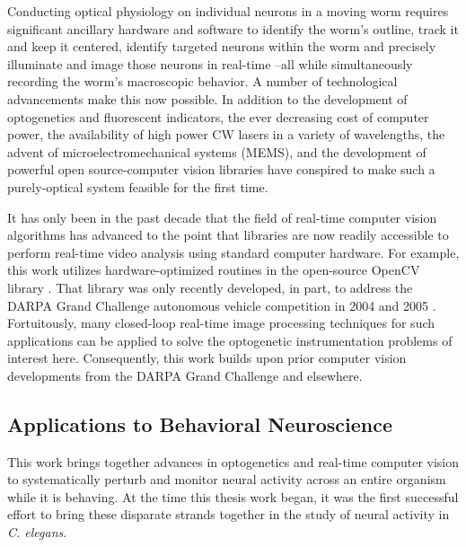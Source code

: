 Conducting optical physiology on individual neurons in a moving worm requires significant ancillary hardware and software to identify the worm's outline, track it and keep it centered, identify targeted neurons within the worm and precisely illuminate and image those neurons in real-time --all while simultaneously recording the worm's macroscopic behavior. 
A number of technological advancements  make this now possible. In addition to the development of optogenetics and fluorescent indicators, the ever decreasing cost of computer power, the  availability of high power CW lasers in a variety of wavelengths,  the advent of microelectromechanical systems (MEMS), and the development of powerful open source-computer vision libraries have  conspired to make such a purely-optical system feasible for the first time. 

It has only been in the past decade that the field of real-time computer vision algorithms has advanced to the point that libraries are now readily accessible to  perform real-time video analysis using standard computer hardware. For example, this work utilizes hardware-optimized routines in the open-source OpenCV library \citep{bradski_opencv_2000,bradski_learning_2008}. That library was only recently developed, in part, to address the DARPA Grand Challenge autonomous vehicle competition in 2004 and 2005  \citep{stavens_learning_2011,buehler_stanley:_2007}. Fortuitously, many closed-loop real-time image processing
techniques for such applications can be applied to solve the optogenetic instrumentation problems of interest here. Consequently, this work builds upon prior computer vision developments from the DARPA Grand Challenge and elsewhere.



\subsection{Applications to Behavioral Neuroscience}


This work brings together advances in optogenetics and real-time computer vision to systematically perturb and monitor neural activity across an entire organism while it is behaving.  At the time this thesis work began, it was the first successful effort to bring these disparate strands together in the study of neural activity in \textit{C. elegans}.

